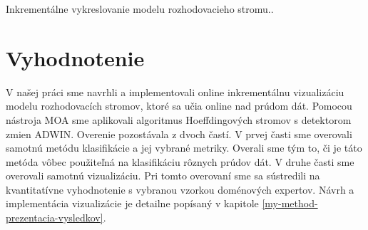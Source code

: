 \begin{algorithm}[H]
	\label{alg:visualization}
	\SetAlgoLined
    

  \caption{Inkrementálne vykreslovanie modelu rozhodovacieho stromu..}
\end{algorithm}


\chapter{Vyhodnotenie}
V našej práci sme navrhli a implementovali online inkrementálnu vizualizáciu modelu rozhodovacích stromov, ktoré sa učia online nad prúdom dát. Pomocou nástroja MOA sme aplikovali algoritmus Hoeffdingových stromov s detektorom zmien ADWIN. Overenie pozostávala z dvoch častí. V prvej časti sme overovali samotnú metódu klasifikácie a jej vybrané metriky. Overali sme tým to, či je táto metóda vôbec použiteľná na klasifikáciu rôznych prúdov dát. V druhe časti sme overovali samotnú vizualizáciu. Pri tomto overovaní sme sa sústredili na kvantitatívne vyhodnotenie s vybranou vzorkou doménových expertov. Návrh a implementácia vizualizácie je detailne popísaný v kapitole \ref{my-method-prezentacia-vysledkov}.


